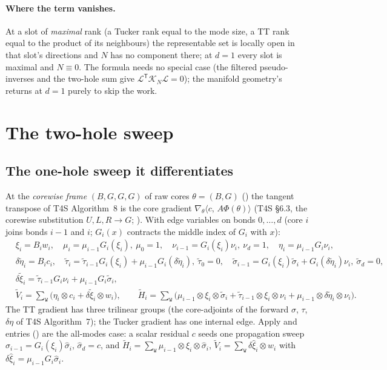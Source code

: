 \documentclass[11pt]{article}
\newcommand{\Lift}{\mathcal{L}}
\newcommand{\K}{\mathcal{K}}
\newcommand{\T}{\mathsf{T}}
\newcommand{\ip}[2]{\langle #1,\, #2\rangle}
\renewcommand{\th}{\theta}
\newcommand{\ddet}{\delta\tilde\eta}
\newcommand{\dxt}{\delta\tilde\xi}
\theoremstyle{definition}
\theoremstyle{plain}
\begin{document}
\paragraph{Where the term vanishes.} At a slot of \emph{maximal} rank (a Tucker rank equal to the mode size, a TT
rank equal to the product of its neighbours) the representable set is locally open in that slot's directions and
$N$ has no component there; at $d=1$ every slot is maximal and $N\equiv0$. The formula needs no special case
(the filtered pseudo-inverses and the two-hole sum give $\Lift^\T\K_N\Lift=0$); the manifold geometry's
 returns  at $d=1$ purely to skip the work.

\section{The two-hole sweep}
\label{sec:twohole}

\subsection{The one-hole sweep it differentiates}

At the \emph{corewise frame} $(B,G,G,G)$ of raw cores $\th=(B,G)$ () the tangent
transpose of T4S Algorithm~8 is the core gradient $\nabla_\th\ip{c}{A\Phi(\th)}$ (T4S \S6.3, the corewise
substitution $U,L,R\to G$; ). With edge variables on bonds $0,\dots,d$ (core $i$
joins bonds $i-1$ and $i$; $G_i(x)$ contracts the middle index of $G_i$ with $x$):
\begin{align}
  \label{eq:fwd}
  &\xi_i=B_iw_i,\quad \mu_i=\mu_{i-1}G_i(\xi_i),\ \mu_0=1,\quad \nu_{i-1}=G_i(\xi_i)\nu_i,\ \nu_d=1,\quad
   \eta_i=\mu_{i-1}G_i\nu_i, \\
  \label{eq:adj}
  &\ddet_i=B_ic_i,\quad \tilde\tau_i=\tilde\tau_{i-1}G_i(\xi_i)+\mu_{i-1}G_i(\ddet_i),\ \tilde\tau_0=0,\quad
   \tilde\sigma_{i-1}=G_i(\xi_i)\tilde\sigma_i+G_i(\ddet_i)\nu_i,\ \tilde\sigma_d=0, \\
  \label{eq:dxt}
  &\dxt_i=\tilde\tau_{i-1}G_i\nu_i+\mu_{i-1}G_i\tilde\sigma_i, \\
  \label{eq:asm}
  &\tilde V_i=\textstyle\sum_{\mathtt W}\big(\eta_i\otimes c_i+\dxt_i\otimes w_i\big),\qquad
   \tilde H_i=\sum_{\mathtt W}\big(\mu_{i-1}\otimes\xi_i\otimes\tilde\sigma_i
   +\tilde\tau_{i-1}\otimes\xi_i\otimes\nu_i+\mu_{i-1}\otimes\ddet_i\otimes\nu_i\big).
\end{align}
The TT gradient has three trilinear groups (the core-adjoints of the forward $\sigma$, $\tau$, $\delta\eta$ of
T4S Algorithm~7); the Tucker gradient has one internal edge. Apply and entries ()
are the all-modes case: a scalar residual $c$ seeds one propagation sweep
$\hat\sigma_{i-1}=G_i(\xi_i)\hat\sigma_i$, $\hat\sigma_d=c$, and $\tilde H_i=\sum_{\mathtt W}\mu_{i-1}\otimes
\xi_i\otimes\hat\sigma_i$, $\tilde V_i=\sum_{\mathtt W}\delta\hat\xi_i\otimes w_i$ with
$\delta\hat\xi_i=\mu_{i-1}G_i\hat\sigma_i$.
\end{document}
